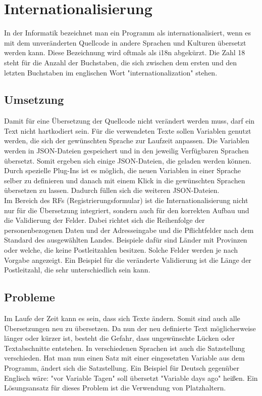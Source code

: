 \chapter{Internationalisierung}
In der Informatik bezeichnet man ein Programm als internationalisiert, wenn es mit dem unveränderten Quellcode in andere Sprachen und Kulturen übersetzt werden kann. Diese Bezeichnung wird oftmals als i18n abgekürzt. Die Zahl 18 steht für die Anzahl der Buchstaben, die sich zwischen dem ersten und den letzten Buchstaben im englischen Wort "internationalization" stehen. \autocite{wikii18n}
\section{Umsetzung}
Damit für eine Übersetzung der Quellcode nicht verändert werden muss, darf ein Text nicht hartkodiert sein. Für die verwendeten Texte sollen Variablen genutzt werden, die sich der gewünschten Sprache zur Laufzeit anpassen. Die Variablen werden in JSON-Dateien gespeichert und in den jeweilig Verfügbaren Sprachen übersetzt. Somit ergeben sich einige JSON-Dateien, die geladen werden können. Durch spezielle Plug-Ins ist es möglich, die neuen Variablen in einer Sprache selber zu definieren und danach mit einem Klick in die gewünschten Sprachen übersetzen zu lassen. Dadurch füllen sich die weiteren JSON-Dateien.\autocite{wikii18n}\\
Im Bereich des RFs (Registrierungsformular) ist die Internationalisierung nicht nur für die Übersetzung integriert, sondern auch für den korrekten Aufbau und die Validierung der Felder. Dabei richtet sich die Reihenfolge der personenbezogenen Daten und der Adresseingabe und die Pflichtfelder nach dem Standard des ausgewählten Landes. Beispiele dafür sind Länder mit Provinzen oder welche, die keine Postleitzahlen besitzen. Solche Felder werden je nach Vorgabe angezeigt. Ein Beispiel für die veränderte Validierung ist die Länge der Postleitzahl, die sehr unterschiedlich sein kann.\autocite{wikii18n}
\section{Probleme}
Im Laufe der Zeit kann es sein, dass sich Texte ändern. Somit sind auch alle Übersetzungen neu zu übersetzen. Da nun der neu definierte Text möglicherweise länger oder kürzer ist, besteht die Gefahr, dass ungewünschte Lücken oder Textabschnitte entstehen. In verschiedenen Sprachen ist auch die Satzstellung verschieden. Hat man nun einen Satz mit einer eingesetzten Variable aus dem Programm, ändert sich die Satzstellung. Ein Beispiel für Deutsch gegenüber Englisch wäre: "vor {Variable} Tagen" soll übersetzt "{Variable} days ago" heißen. Ein Lösungsansatz für dieses Problem ist die Verwendung von Platzhaltern.\autocite{wikii18n}